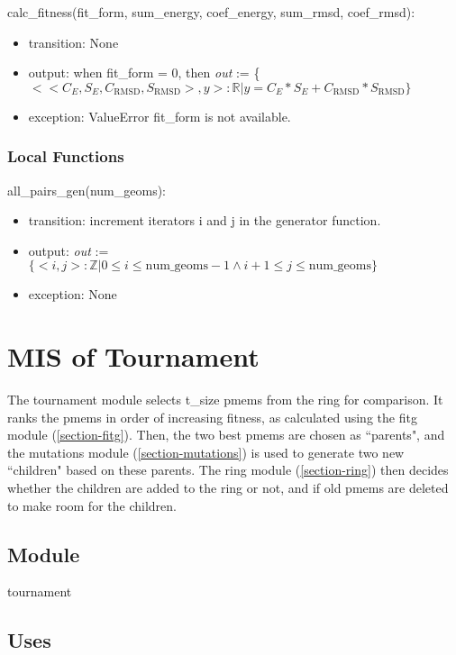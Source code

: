 \documentclass[12pt, titlepage]{article}
\begin{document}
\noindent calc\_fitness(fit\_form, sum\_energy, coef\_energy, sum\_rmsd, 
coef\_rmsd):
\begin{itemize}
	\item transition: None
	\item output: when fit\_form = 0, then \textit{out} := \{
	$<<C_E,S_E,C_{\text{RMSD}},S_{\text{RMSD}}>,y> : \mathbb{R} | y = 
	C_E*S_E+C_{\text{RMSD}}*S_{\text{RMSD}} \}$
	\item exception: ValueError fit\_form is not available.
\end{itemize}

\subsubsection{Local Functions}

\noindent all\_pairs\_gen(num\_geoms):
\begin{itemize}
	\item transition: increment iterators i and j in the generator function.
	\item output: \textit{out} := $\{<i,j>: \mathbb{Z} | 0 \leq i \leq 
	\text{num\_geoms}-1 \land i+1 \leq j \leq \text{num\_geoms}\}$
	\item exception: None
\end{itemize}

\section{MIS of Tournament} \label{section-tournament} 

The tournament module selects t\_size pmems from the ring for comparison. It 
ranks the pmems in order of increasing fitness, as calculated using the fitg 
module (\ref{section-fitg}). Then, the two best pmems are chosen as ``parents", 
and the mutations module (\ref{section-mutations}) is used to generate two new 
``children" based on these parents. The ring module (\ref{section-ring}) then 
decides whether the children are added to the ring or not, and if old pmems are 
deleted to make room for the children.

\subsection{Module}

tournament

\subsection{Uses}
\end{document}
